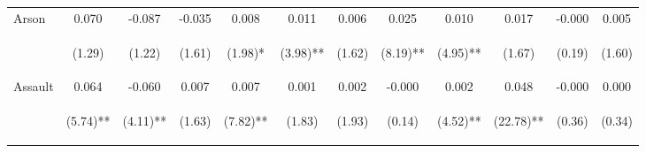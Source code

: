 \begin{tabular}{lccccccccccc}
\noalign{\smallskip}Arson & 0.070 & -0.087 & -0.035 & 0.008 & 0.011 & 0.006 & 0.025 & 0.010 & 0.017 & -0.000 & 0.005\\
 & \begin{footnotesize}(1.29)\end{footnotesize} & \begin{footnotesize}(1.22)\end{footnotesize} & \begin{footnotesize}(1.61)\end{footnotesize} & \begin{footnotesize}(1.98)*\end{footnotesize} & \begin{footnotesize}(3.98)**\end{footnotesize} & \begin{footnotesize}(1.62)\end{footnotesize} & \begin{footnotesize}(8.19)**\end{footnotesize} & \begin{footnotesize}(4.95)**\end{footnotesize} & \begin{footnotesize}(1.67)\end{footnotesize} & \begin{footnotesize}(0.19)\end{footnotesize} & \begin{footnotesize}(1.60)\end{footnotesize}\\
\noalign{\smallskip}Assault & 0.064 & -0.060 & 0.007 & 0.007 & 0.001 & 0.002 & -0.000 & 0.002 & 0.048 & -0.000 & 0.000\\
 & \begin{footnotesize}(5.74)**\end{footnotesize} & \begin{footnotesize}(4.11)**\end{footnotesize} & \begin{footnotesize}(1.63)\end{footnotesize} & \begin{footnotesize}(7.82)**\end{footnotesize} & \begin{footnotesize}(1.83)\end{footnotesize} & \begin{footnotesize}(1.93)\end{footnotesize} & \begin{footnotesize}(0.14)\end{footnotesize} & \begin{footnotesize}(4.52)**\end{footnotesize} & \begin{footnotesize}(22.78)**\end{footnotesize} & \begin{footnotesize}(0.36)\end{footnotesize} & \begin{footnotesize}(0.34)\end{footnotesize}\\

\end{tabular}
